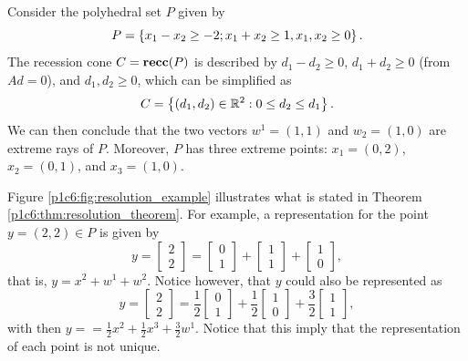 Consider the polyhedral set $P$ given by
%
\begin{equation*}
	P = \left\{ x_1 - x_2 \geq -2; x_1 + x_2 \geq 1, x_1,x_2 \geq 0 \right \}.
\end{equation*}
%
The recession cone $C = {\bf recc}(P)$ is described by $d_1 - d_2 \geq 0$, $d_1 + d_2 \geq 0$ (from $Ad =0$), and $d_1, d_2 \geq 0$, which can be simplified as 
%
\begin{equation*}
	C = \left\{ (d_1, d_2) \in \mathbb{R}^2 : 0 \leq d_2 \leq d_1 \right \}.
\end{equation*}
%
We can then conclude that the two vectors $w^1 = (1,1)$ and $w_2 = (1,0)$ are extreme rays of $P$. Moreover, $P$ has three extreme points: $x_1 = (0,2)$, $x_2 = (0,1)$, and $x_3 = (1,0)$.

Figure \ref{p1c6:fig:resolution_example} illustrates what is stated in Theorem \ref{p1c6:thm:resolution_theorem}. For example,  a representation for the point $y = (2,2) \in P$ is given by
%
\begin{equation*}
	y = \begin{bmatrix} 2 \\ 2
		\end{bmatrix}= \begin{bmatrix} 0 \\ 1
		\end{bmatrix} + \begin{bmatrix} 1 \\ 1
		\end{bmatrix} + \begin{bmatrix} 1 \\ 0
		\end{bmatrix}, 	
\end{equation*}
%
that is, $y = x^2 + w^1 + w^2$. Notice however, that $y$ could also be represented as 
%
\begin{equation*}
	y = \begin{bmatrix} 2 \\ 2
		\end{bmatrix}= \frac{1}{2}\begin{bmatrix} 0 \\ 1
		\end{bmatrix} + \frac{1}{2}\begin{bmatrix} 1 \\ 0
		\end{bmatrix} + \frac{3}{2}\begin{bmatrix} 1 \\ 1
		\end{bmatrix}, 	
\end{equation*}
%
with then $y = = \frac{1}{2}x^2 + \frac{1}{2}x^3 + \frac{3}{2}w^1$. Notice that this imply that the representation of each point is not unique.

